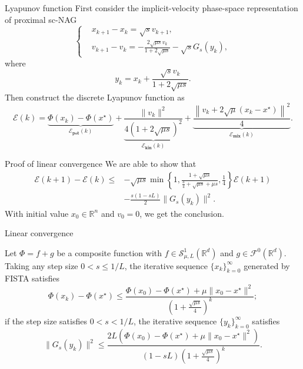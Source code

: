 \documentclass[10pt]{beamer}
\begin{document}
\begin{frame}{Lyapunov function}
  First consider the implicit-velocity phase-space representation of proximal sc-NAG
  \begin{equation}
    \label{eqn: iv-phase}
    \left\{
    \begin{aligned}
      & x_{k+1} - x_{k} = \sqrt{s}v_{k+1},  \\
      & v_{k+1} - v_{k} = - \frac{2\sqrt{\mu s}v_{k}}{1+2\sqrt{\mu s}} - \sqrt{s}G_s(y_k),
    \end{aligned}
    \right.
    \end{equation}
    where 
    \begin{equation*}
      y_k = x_{k} + \frac{\sqrt{s}v_{k}}{1+2\sqrt{\mu s}}.
    \end{equation*}
    Then construct the discrete Lyapunov function as 
    \begin{equation*}
      \mathcal{E}(k) = \underbrace{\Phi(x_{k}) - \Phi(x^{\star})}_{\mathcal{E}_{\textbf{pot}}(k)} + \underbrace{\frac{\|v_{k}\|^2}{4(1+2\sqrt{\mu s})^2}}_{\mathcal{E}_{\textbf{kin}}(k)} +  \underbrace{\frac{\left\|v_{k} +2\sqrt{\mu}(x_{k} - x^\star)\right\|^2 }{4}}_{\mathcal{E}_{\textbf{mix}}(k)}.
      \end{equation*}
\end{frame}

\begin{frame}{Proof of linear convergence}
  We are able to show that 
  \begin{align*}
    \mathcal{E}(k+1) - \mathcal{E}(k) \leq & -\sqrt{\mu s} \min\left\{1, \frac{1+\sqrt{\mu s}}{\frac{3}{4} + \sqrt{\mu s} + \mu s}, \frac14 \right\}\mathcal{E}(k+1) \\
    & -\frac{s (1-sL) }{2} \|G_s(y_k)\|^2.
  \end{align*}
  With initial value $x_0\in \mathbb{R}^n$ and $v_0 = 0$, we get the conclusion.
\end{frame}

\begin{frame}{Linear convergence}
  \begin{theorem}
    Let $\Phi = f+ g$ be a composite function with $f \in \mathcal{S}_{\mu,L}^{1}(\mathbb{R}^d)$ and $g \in \mathcal{F}^0(\mathbb{R}^d)$. Taking any step size $0 < s \leq 1/L$, the iterative sequence $\{x_k\}_{k=0}^{\infty}$ generated by FISTA satisfies
    \begin{equation}
    \label{eqn: fista_rate_obj_1}
    \Phi(x_{k}) - \Phi(x^\star) \leq \frac{\Phi(x_0) - \Phi(x^\star) + \mu\|x_0 - x^\star\|^2}{\left(1 + \frac{\sqrt{\mu s}}{4}\right)^k};
    \end{equation}
    if the step size satisfies $0 < s < 1/L$, the iterative sequence $\{y_k\}_{k=0}^{\infty}$ satisfies
    \begin{equation}
    \label{eqn: fista_rate_gn_1}
    \|G_s(y_k)\|^2 \leq \frac{2L\left(\Phi(x_0) - \Phi(x^\star) + \mu\|x_0 - x^\star\|^2\right)}{(1-sL)\left(1 + \frac{\sqrt{\mu s}}{4}\right)^k}.
    \end{equation}
    \end{theorem}
\end{frame}
\end{document}

